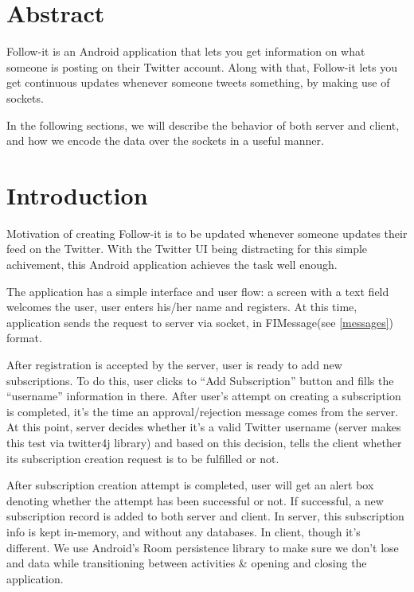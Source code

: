 \documentclass{article}
\begin{document}
\maketitle

\tableofcontents

\newpage

\section{Abstract}
Follow-it is an Android application that lets you get information on what someone is posting on their Twitter account. Along with that, Follow-it lets you get continuous updates whenever someone tweets something, by making use of sockets.

In the following sections, we will describe the behavior of both server and client, and how we encode the data over the sockets in a useful manner.

\section{Introduction}
\par Motivation of creating Follow-it is to be updated whenever someone updates their feed on the Twitter. With the Twitter UI being distracting for this simple achivement, this Android application achieves the task well enough.

\par The application has a simple interface and user flow: a screen with a text field welcomes the user, user enters his/her name and registers. At this time, application sends the request to server via socket, in FIMessage(see \ref{messages}) format.

\par After registration is accepted by the server, user is ready to add new subscriptions. To do this, user clicks to ``Add Subscription'' button and fills the ``username'' information in there. After user's attempt on creating a subscription is completed, it's the time an approval/rejection message comes from the server. At this point, server decides whether it's a valid Twitter username (server makes this test via twitter4j\cite{twitter4j} library) and based on this decision, tells the client whether its subscription creation request is to be fulfilled or not.

\par After subscription creation attempt is completed, user will get an alert box denoting whether the attempt has been successful or not. If successful, a new subscription record is added to both server and client. In server, this subscription info is kept in-memory, and without any databases. In client, though it's different. We use Android's Room\cite{room} persistence library to make sure we don't lose and data while transitioning between activities \& opening and closing the application.
\end{document}
